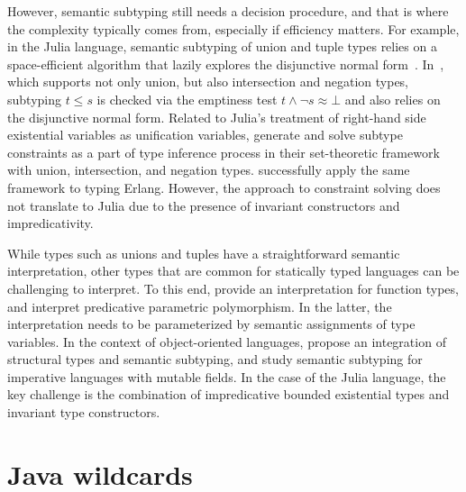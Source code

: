 However, semantic subtyping still needs a decision procedure, and that is where
the complexity typically comes from, especially if efficiency matters.
For example, in the Julia language, semantic subtyping of union and tuple types
relies on a space-efficient algorithm that lazily explores the disjunctive
normal form~\cite{bib:chung:julia-sub-algo:2019}.
In~\cite{bib:frisch:sem-sub:2002}, which supports not only union, but also
intersection and negation types, subtyping $t \leq s$ is checked via
the emptiness test $t \land \lnot s \approx \bot$ and also relies on
the disjunctive normal form.
Related to Julia's treatment of right-hand side existential variables as 
unification variables, \citet{bib:castagna:sem-poly-inf:2015} generate and solve
subtype constraints as a part of type inference process in their set-theoretic
framework with union, intersection, and negation types.
\citet{bib:schimpf:set-types-erlang:2023} successfully apply the
same framework to typing Erlang.
However, the approach to constraint solving does not translate to Julia
due to the presence of invariant constructors and impredicativity.

While types such as unions and tuples have a straightforward
semantic interpretation, other types that are common for statically typed
languages can be challenging to interpret.
To this end, \citet{bib:frisch:sem-sub:2002} provide an interpretation for
function types, and \citet{bib:castagna:sem-poly:2011} interpret predicative
parametric polymorphism. In the latter, the interpretation needs to be
parameterized by semantic assignments of type variables.
In the context of object-oriented languages,
\citet{bib:dardha:sem-sub-obj:2016} propose an integration of structural types and
semantic subtyping, and \citet{bib:ancona:sem-sub-imp:2016} study semantic
subtyping for imperative languages with mutable fields.
In the case of the Julia language, %
the key challenge is the combination of
impredicative bounded existential types and invariant type constructors.

\section{Java wildcards}

